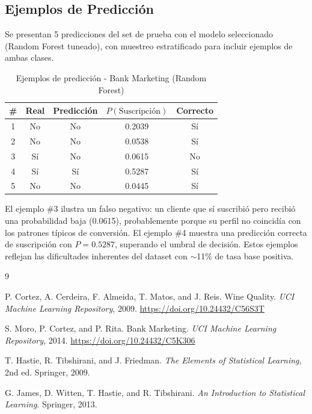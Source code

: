 \documentclass[11pt,spanish]{article}
\begin{document}
\subsection{Ejemplos de Predicción}

Se presentan 5 predicciones del set de prueba con el modelo seleccionado (Random Forest tuneado), con muestreo estratificado para incluir ejemplos de ambas clases.

\begin{table}[H]
\centering
\caption{Ejemplos de predicción - Bank Marketing (Random Forest)}
\label{tab:pred_bank}
\begin{tabular}{ccccc}
\toprule
\textbf{\#} & \textbf{Real} & \textbf{Predicción} & \textbf{$P(\text{Suscripción})$} & \textbf{Correcto} \\
\midrule
1 & No & No & 0.2039 & Sí \\
2 & No & No & 0.0538 & Sí \\
3 & Sí & No & 0.0615 & No \\
4 & Sí & Sí & 0.5287 & Sí \\
5 & No & No & 0.0445 & Sí \\
\bottomrule
\end{tabular}
\end{table}

El ejemplo \#3 ilustra un falso negativo: un cliente que sí suscribió pero recibió una probabilidad baja (0.0615), probablemente porque su perfil no coincidía con los patrones típicos de conversión. El ejemplo \#4 muestra una predicción correcta de suscripción con $P = 0.5287$, superando el umbral de decisión. Estos ejemplos reflejan las dificultades inherentes del dataset con $\sim$11\% de tasa base positiva.

\begin{thebibliography}{9}

P. Cortez, A. Cerdeira, F. Almeida, T. Matos, and J. Reis. Wine Quality. \textit{UCI Machine Learning Repository}, 2009. \url{https://doi.org/10.24432/C56S3T}

S. Moro, P. Cortez, and P. Rita. Bank Marketing. \textit{UCI Machine Learning Repository}, 2014. \url{https://doi.org/10.24432/C5K306}

T. Hastie, R. Tibshirani, and J. Friedman. \textit{The Elements of Statistical Learning}, 2nd ed. Springer, 2009.

G. James, D. Witten, T. Hastie, and R. Tibshirani. \textit{An Introduction to Statistical Learning}. Springer, 2013.

\end{thebibliography}
\end{document}
